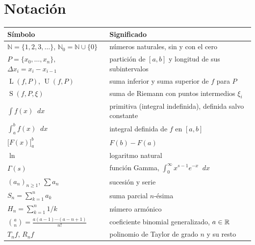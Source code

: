 \documentclass[11pt,a4paper,twoside,openany]{book}
\newcommand{\N}{\mathbb{N}}
\newcommand{\dif}{\mathop{}\!d}
\newcommand{\Lsum}{\operatorname{L}}
\newcommand{\Usum}{\operatorname{U}}
\newcommand{\Rsum}{\operatorname{S}}
\newcommand{\eval}[3]{\bigl[#1\bigr]_{#2}^{#3}}
\begin{document}
\section*{Notación}
\begin{center}
\begin{tabular}{@{}ll@{}}
\toprule
Símbolo & Significado \\
\midrule
$\N=\{1,2,3,\dots\}$, $\N_0=\N\cup\{0\}$ & números naturales, sin y con el cero \\
$P=\{x_0,\dots,x_n\}$, $\Delta x_i=x_i-x_{i-1}$ & partición de $[a,b]$ y longitud de sus subintervalos \\
$\Lsum(f,P)$, $\Usum(f,P)$ & suma inferior y suma superior de $f$ para $P$ \\
$\Rsum(f,P,\xi)$ & suma de Riemann con puntos intermedios $\xi_i$ \\
$\int f(x)\dif x$ & primitiva (integral indefinida), definida salvo constante \\
$\int_a^b f(x)\dif x$ & integral definida de $f$ en $[a,b]$ \\
$\eval{F(x)}{a}{b}$ & $F(b)-F(a)$ \\
$\ln$ & logaritmo natural \\
$\Gamma(s)$ & función Gamma, $\int_0^\infty x^{s-1}e^{-x}\dif x$ \\
$(a_n)_{n\ge1}$, $\sum a_n$ & sucesión y serie \\
$S_n=\sum_{k=1}^{n}a_k$ & suma parcial $n$-ésima \\
$H_n=\sum_{k=1}^{n}1/k$ & número armónico \\
$\binom{a}{n}=\frac{a(a-1)\cdots(a-n+1)}{n!}$ & coeficiente binomial generalizado, $a\in\mathbb{R}$ \\
$T_n f$, $R_n f$ & polinomio de Taylor de grado $n$ y su resto \\
\bottomrule
\end{tabular}
\end{center}

\tableofcontents

\mainmatter







\appendix


\backmatter

\end{document}
